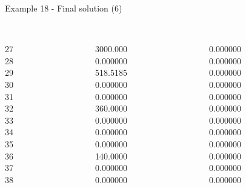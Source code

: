\begin{frame}{Example 18 - Final solution (6)}
\begin{columns}[t]
\begin{column}{0.3\textwidth}
\\
27\\
28\\
29\\
30\\
31\\
32\\
33\\
34\\
35\\
36\\
37\\
38\\

\end{column}
\begin{column}{0.3\textwidth}
\\
3000.000\\
0.000000\\
518.5185\\
0.000000\\
0.000000\\
360.0000\\
0.000000\\
0.000000\\
0.000000\\
140.0000\\
0.000000\\
0.000000\\

\end{column}

\begin{column}{0.3\textwidth}
\\
0.000000\\
0.000000\\
0.000000\\
0.000000\\
0.000000\\
0.000000\\
0.000000\\
0.000000\\
0.000000\\
0.000000\\
0.000000\\
0.000000\\
\end{column}
\end{columns}
\end{frame}
